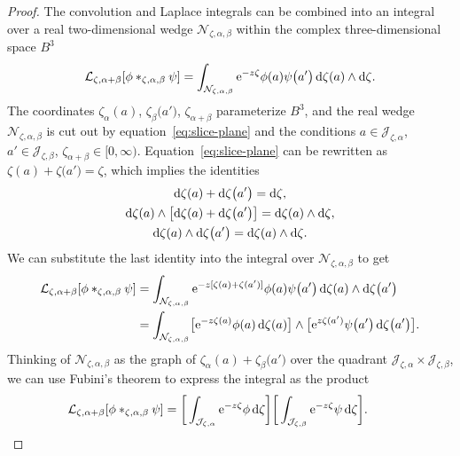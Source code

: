 \documentclass[pdftex]{sigma}
\newcommand{\laplace}{\mathcal{L}}
\numberwithin{equation}{section}
\begin{document}
\begin{proof}
The convolution and Laplace integrals can be combined into an integral over a real two-dimensional wedge $\mathcal{N}_{\zeta, \alpha, \beta}$ within the complex three-dimensional space $B^3$
\[ \laplace_{\zeta,\alpha+\beta}[{\phi}\ast_{\zeta, \alpha,\beta}{\psi}] = \int_{\mathcal{N}_{\zeta, \alpha, \beta}} {\rm e}^{-z\zeta} \phi(a) \psi\bigl(a'\bigr) \,{\rm d}\zeta(a) \wedge {\rm d}\zeta. \]
The coordinates $\zeta_\alpha(a)$, $\zeta_\beta\bigl(a'\bigr)$, $\zeta_{\alpha+\beta}$ parameterize $B^3$, and the real wedge $\mathcal{N}_{\zeta, \alpha, \beta}$ is cut out by equation~\eqref{eq:slice-plane} and the conditions
$
a \in \mathcal{J}_{\zeta, \alpha}$,
$a' \in \mathcal{J}_{\zeta, \beta}$,
$\zeta_{\alpha+\beta} \in [0, \infty)$.
Equation~\eqref{eq:slice-plane} can be rewritten as $\zeta(a) + \zeta\bigl(a'\bigr) = \zeta$, which implies the identities
\begin{gather*}
{\rm d}\zeta(a) + {\rm d}\zeta\bigl(a'\bigr) = {\rm d}\zeta ,\\
{\rm d}\zeta(a) \wedge \bigl[{\rm d}\zeta(a) + {\rm d}\zeta\bigl(a'\bigr)\bigr] = {\rm d}\zeta(a) \wedge {\rm d}\zeta, \\
{\rm d}\zeta(a) \wedge {\rm d}\zeta\bigl(a'\bigr) = {\rm d}\zeta(a) \wedge {\rm d}\zeta.
\end{gather*}
We can substitute the last identity into the integral over $\mathcal{N}_{\zeta, \alpha, \beta}$ to get
\begin{align*}
\laplace_{\zeta,\alpha+\beta}[{\phi}\ast_{\zeta, \alpha,\beta}{\psi}] & = \int_{\mathcal{N}_{\zeta, \alpha, \beta}} {\rm e}^{-z[\zeta(a) + \zeta(a')]} \phi(a) \psi\bigl(a'\bigr) \,{\rm d}\zeta(a) \wedge {\rm d}\zeta\bigl(a'\bigr) \\
& = \int_{\mathcal{N}_{\zeta, \alpha, \beta}} \bigl[ {\rm e}^{-z\zeta(a)} \phi(a)\, {\rm d}\zeta(a) \bigr] \wedge \bigl[ {\rm e}^{z\zeta(a')} \psi\bigl(a'\bigr) \,{\rm d}\zeta\bigl(a'\bigr) \bigr].
\end{align*}
Thinking of $\mathcal{N}_{\zeta, \alpha, \beta}$ as the graph of $\zeta_\alpha(a) + \zeta_\beta\bigl(a'\bigr)$ over the quadrant $\mathcal{J}_{\zeta, \alpha} \times \mathcal{J}_{\zeta, \beta}$, we can use Fubini's theorem to express the integral as the product
\[ \laplace_{\zeta,\alpha+\beta}[{\phi}\ast_{\zeta, \alpha,\beta}{\psi}] = \bigg[ \int_{\mathcal{J}_{\zeta, \alpha}} {\rm e}^{-z\zeta} \phi\, {\rm d}\zeta \bigg] \bigg[ \int_{\mathcal{J}_{\zeta,\beta}} {\rm e}^{-z\zeta} \psi\, {\rm d}\zeta \bigg]. \tag*{\qed}
\]\renewcommand{\qed}{}
\end{proof}
\end{document}
